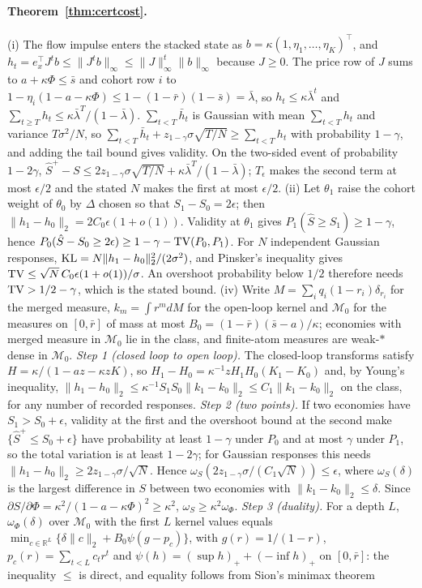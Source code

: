 \documentclass[12pt]{article}
\theoremstyle{definition}
\theoremstyle{remark}
\begin{document}
\paragraph{Theorem~\ref{thm:certcost}.} (i) The flow impulse enters the stacked state as $b=\kappa(1,\eta_1,\ldots,\eta_K)^\top$, and $h_t=e_x^\top J^tb\le\|J^tb\|_\infty\le\|J\|_\infty^t\|b\|_\infty$ because $J\ge0$. The price row of $J$ sums to $a+\kappa\Phi\le\bar s$ and cohort row $i$ to $1-\eta_i(1-a-\kappa\Phi)\le1-(1-\bar r)(1-\bar s)=\bar\lambda$, so $h_t\le\kappa\bar\lambda^t$ and $\sum_{t\ge T}h_t\le\kappa\bar\lambda^T/(1-\bar\lambda)$. $\sum_{t<T}\bar h_t$ is Gaussian with mean $\sum_{t<T}h_t$ and variance $T\sigma^2/N$, so $\sum_{t<T}\bar h_t+z_{1-\gamma}\sigma\sqrt{T/N}\ge\sum_{t<T}h_t$ with probability $1-\gamma$, and adding the tail bound gives validity. On the two-sided event of probability $1-2\gamma$, $\hat S^+-S\le2z_{1-\gamma}\sigma\sqrt{T/N}+\kappa\bar\lambda^T/(1-\bar\lambda)$; $T_\epsilon$ makes the second term at most $\epsilon/2$ and the stated $N$ makes the first at most $\epsilon/2$. (ii) Let $\theta_1$ raise the cohort weight of $\theta_0$ by $\Delta$ chosen so that $S_1-S_0=2\epsilon$; then $\|h_1-h_0\|_2=2C_0\epsilon(1+o(1))$. Validity at $\theta_1$ gives $P_1(\hat S\ge S_1)\ge1-\gamma$, hence $P_0(\hat S-S_0\ge2\epsilon)\ge1-\gamma-{\rm TV}(P_0,P_1)$. For $N$ independent Gaussian responses, ${\rm KL}=N\|h_1-h_0\|_2^2/(2\sigma^2)$, and Pinsker's inequality gives ${\rm TV}\le\sqrt N\,C_0\epsilon(1+o(1))/\sigma$. An overshoot probability below $1/2$ therefore needs ${\rm TV}>1/2-\gamma$, which is the stated bound. (iv) Write $M=\sum_iq_i(1-r_i)\delta_{r_i}$ for the merged measure, $k_m=\int r^m dM$ for the open-loop kernel and $\mathcal M_0$ for the measures on $[0,\bar r]$ of mass at most $B_0=(1-\bar r)(\bar s-a)/\kappa$; economies with merged measure in $\mathcal M_0$ lie in the class, and finite-atom measures are weak-$*$ dense in $\mathcal M_0$. \emph{Step 1 (closed loop to open loop).} The closed-loop transforms satisfy $H=\kappa/(1-az-\kappa zK)$, so $H_1-H_0=\kappa^{-1}zH_1H_0(K_1-K_0)$ and, by Young's inequality, $\|h_1-h_0\|_2\le\kappa^{-1}S_1S_0\|k_1-k_0\|_2\le C_1\|k_1-k_0\|_2$ on the class, for any number of recorded responses. \emph{Step 2 (two points).} If two economies have $S_1>S_0+\epsilon$, validity at the first and the overshoot bound at the second make $\{\hat S^+\le S_0+\epsilon\}$ have probability at least $1-\gamma$ under $P_0$ and at most $\gamma$ under $P_1$, so the total variation is at least $1-2\gamma$; for Gaussian responses this needs $\|h_1-h_0\|_2\ge2z_{1-\gamma}\sigma/\sqrt N$. Hence $\omega_S(2z_{1-\gamma}\sigma/(C_1\sqrt N))\le\epsilon$, where $\omega_S(\delta)$ is the largest difference in $S$ between two economies with $\|k_1-k_0\|_2\le\delta$. Since $\partial S/\partial\Phi=\kappa^2/(1-a-\kappa\Phi)^2\ge\kappa^2$, $\omega_S\ge\kappa^2\omega_\Phi$. \emph{Step 3 (duality).} For a depth $L$, $\omega_\Phi(\delta)$ over $\mathcal M_0$ with the first $L$ kernel values equals $\min_{c\in\mathbb R^L}\{\delta\|c\|_2+B_0\psi(g-p_c)\}$, with $g(r)=1/(1-r)$, $p_c(r)=\sum_{t<L}c_tr^t$ and $\psi(h)=(\sup h)_++(-\inf h)_+$ on $[0,\bar r]$: the inequality $\le$ is direct, and equality follows from Sion's minimax theorem 
\end{document}

